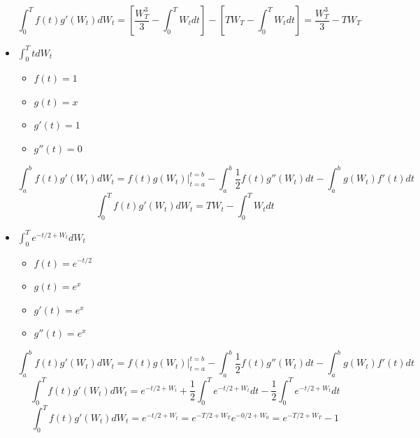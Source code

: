 \documentclass[11pt,fleqn]{book} %
\numberwithin{equation}{section} %
\numberwithin{figure}{section} %
\numberwithin{table}{section} %
\begin{document}
\begin{itemize}
    $$ \int_{0}^{T} f(t)g'(W_t)dW_t= [ \frac{W_{T}^{3}}{3} - \int_{0}^{T} W_{t} dt] - [ TW_{T} - \int_{0}^{T} W_{t} dt ] = \frac{W_{T}^{3}}{3} -  TW_{T}  $$
    \item $\int_{0}^{T} t dW_{t}   $
        \begin{itemize}
            \item $f(t) = 1 $
            \item $g(t) =  x$
            \item $g'(t) =  1$
            \item $g''(t) =  0$
        \end{itemize}
    $$\int^{b}_{a} f(t)g'(W_t)dW_t= f(t)g(W_t)|^{t=b}_{t=a}-\int^{b}_{a} \frac{1}{2}f(t)g''(W_t)dt-\int^{b}_{a} g(W_t)f'(t)dt$$
    $$ \int_{0}^{T} f(t)g'(W_t)dW_t= TW_{t} - \int_{0}^{T} W_{t} dt   $$
    \item $\int_{0}^{T} e^{-t/2 + W_{t}} dW_{t}   $
        \begin{itemize}
            \item $f(t) = e^{-t/2} $
            \item $g(t) = e^{x}$
            \item $g'(t) = e^{x}$
            \item $g''(t) =e^{x} $
        \end{itemize}
    $$\int^{b}_{a} f(t)g'(W_t)dW_t= f(t)g(W_t)|^{t=b}_{t=a}-\int^{b}_{a} \frac{1}{2}f(t)g''(W_t)dt-\int^{b}_{a} g(W_t)f'(t)dt$$
    $$ \int_{0}^{T} f(t)g'(W_t)dW_t= e^{-t/2 + W_{t}} + \frac{1}{2} \int_{0}^{T} e^{-t/2 + W_{t}} dt - \frac{1}{2} \int_{0}^{T} e^{-t/2 + W_{t}} dt   $$
    $$ \int_{0}^{T} f(t)g'(W_t)dW_t= e^{-t/2 + W_{t}} = e^{-T/2 + W_{T}} e^{-0/2 + W_{0}} = e^{-T/2 + W_{T}} - 1    $$
\end{itemize}
\end{document}
